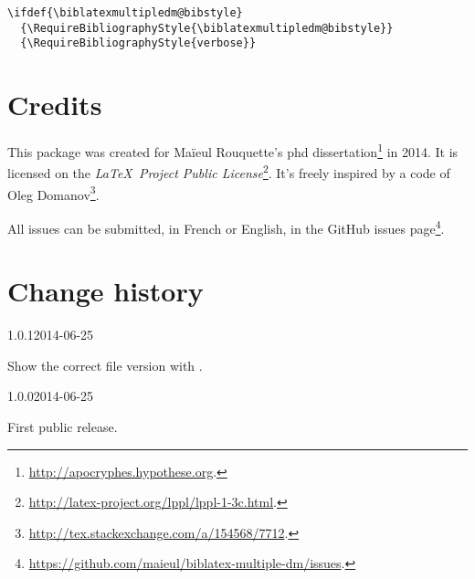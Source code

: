 \documentclass{ltxdockit}[2011/03/25]
\begin{document}
\begin{verbatim}
\ifdef{\biblatexmultipledm@bibstyle}
  {\RequireBibliographyStyle{\biblatexmultipledm@bibstyle}}
  {\RequireBibliographyStyle{verbose}}
\end{verbatim} 

\section{Credits}

This package was created for Maïeul Rouquette's phd dissertation\footnote{\url{http://apocryphes.hypothese.org}.} in 2014. It is licensed on the \emph{\LaTeX\ Project Public License}\footnote{\url{http://latex-project.org/lppl/lppl-1-3c.html}.}. It's freely inspired by a code of Oleg Domanov\footnote{\url{http://tex.stackexchange.com/a/154568/7712}.}.


All issues can be submitted, in French or English, in the GitHub issues page\footnote{\url{https://github.com/maieul/biblatex-multiple-dm/issues}.}.

\section{Change history}

\begin{changelog}

\begin{release}{1.0.1}{2014-06-25}
\item Show the correct file version with .
\end{release}


\begin{release}{1.0.0}{2014-06-25}
\item First public release.
\end{release}
\end{changelog}
\end{document}
